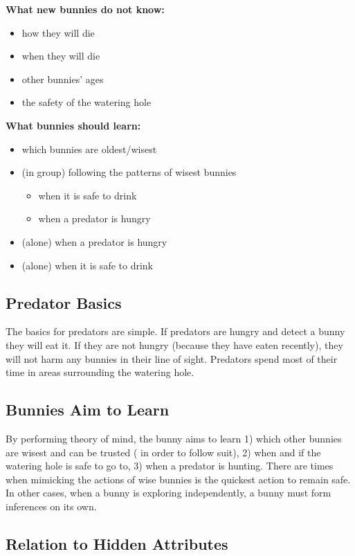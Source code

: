 \documentclass[twocolumn]{article}
\begin{document}
\noindent\textbf{What new bunnies do not know:}
\begin{itemize}
    \item how they will die
    \item when they will die
    \item other bunnies' ages
    \item the safety of the watering hole
\end{itemize}

\noindent\textbf{What bunnies should learn:}
\begin{itemize}
    \item which bunnies are oldest/wisest
    \item (in group) following the patterns of wisest bunnies
        \begin{itemize}
            \item when it is safe to drink
            \item when a predator is hungry 
        \end{itemize}
    \item (alone) when a predator is hungry
    \item (alone) when it is safe to drink
\end{itemize}

\subsection{Predator Basics}

The basics for predators are simple. If predators are hungry and detect a bunny they will eat it. If they are not hungry (because they have eaten recently), they will not harm any bunnies in  their line of sight. Predators spend most of their time in areas surrounding the watering hole. 

\subsection{Bunnies Aim to Learn}
By performing theory of mind, the bunny aims to learn 1) which other bunnies are wisest and can be trusted ( in order to follow suit), 2) when and if the watering hole is safe to go to, 3) when a predator is hunting. There are times when mimicking the actions of wise bunnies is the quickest action to remain safe. In other cases, when a bunny is exploring independently, a bunny must form inferences on its own. 

\subsection{Relation to Hidden Attributes}
\end{document}
